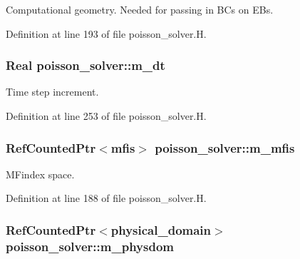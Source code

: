 Computational geometry. Needed for passing in B\+Cs on E\+Bs. 



Definition at line 193 of file poisson\+\_\+solver.\+H.

\subsubsection[{\texorpdfstring{m\+\_\+dt}{m_dt}}]{\setlength{\rightskip}{0pt plus 5cm}Real poisson\+\_\+solver\+::m\+\_\+dt\hspace{0.3cm}{\ttfamily [protected]}}\hypertarget{classpoisson__solver_af34e5aa5b20884df37b580e63e7c4bb3}{}\label{classpoisson__solver_af34e5aa5b20884df37b580e63e7c4bb3}


Time step increment. 



Definition at line 253 of file poisson\+\_\+solver.\+H.

\subsubsection[{\texorpdfstring{m\+\_\+mfis}{m_mfis}}]{\setlength{\rightskip}{0pt plus 5cm}Ref\+Counted\+Ptr$<${\bf mfis}$>$ poisson\+\_\+solver\+::m\+\_\+mfis\hspace{0.3cm}{\ttfamily [protected]}}\hypertarget{classpoisson__solver_ad296eec03cf6d9b7b12856adbb2f8cf8}{}\label{classpoisson__solver_ad296eec03cf6d9b7b12856adbb2f8cf8}


M\+Findex space. 



Definition at line 188 of file poisson\+\_\+solver.\+H.

\subsubsection[{\texorpdfstring{m\+\_\+physdom}{m_physdom}}]{\setlength{\rightskip}{0pt plus 5cm}Ref\+Counted\+Ptr$<${\bf physical\+\_\+domain}$>$ poisson\+\_\+solver\+::m\+\_\+physdom\hspace{0.3cm}{\ttfamily [protected]}}\hypertarget{classpoisson__solver_a09eab2bbcd32775c9622fef8b862a4e2}{}\label{classpoisson__solver_a09eab2bbcd32775c9622fef8b862a4e2}


